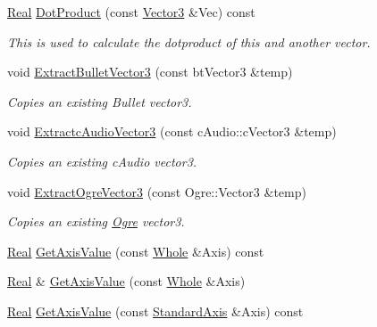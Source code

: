 \begin{DoxyCompactItemize}
\hyperlink{namespaceMezzanine_a726731b1a7df72bf3583e4a97282c6f6}{Real} \hyperlink{classMezzanine_1_1Vector3_ad49630dbeff2f1b63ce7c7e1d0faf4b8}{DotProduct} (const \hyperlink{classMezzanine_1_1Vector3}{Vector3} \&Vec) const 
\begin{DoxyCompactList}\small\item\em This is used to calculate the dotproduct of this and another vector. \item\end{DoxyCompactList}\item 
void \hyperlink{classMezzanine_1_1Vector3_afc8fcb7fb9de94c05db4cc8a568363f9}{ExtractBulletVector3} (const btVector3 \&temp)
\begin{DoxyCompactList}\small\item\em Copies an existing Bullet vector3. \item\end{DoxyCompactList}\item 
void \hyperlink{classMezzanine_1_1Vector3_a067981af0fe3fca1e3589de024473a61}{ExtractcAudioVector3} (const cAudio::cVector3 \&temp)
\begin{DoxyCompactList}\small\item\em Copies an existing cAudio vector3. \item\end{DoxyCompactList}\item 
void \hyperlink{classMezzanine_1_1Vector3_a8458214b99c59a30d9d8cc2d9efd19bd}{ExtractOgreVector3} (const Ogre::Vector3 \&temp)
\begin{DoxyCompactList}\small\item\em Copies an existing \hyperlink{namespaceOgre}{Ogre} vector3. \item\end{DoxyCompactList}\item 
\hyperlink{namespaceMezzanine_a726731b1a7df72bf3583e4a97282c6f6}{Real} \hyperlink{classMezzanine_1_1Vector3_a951233acb0bd76e8ca24f03a96d9ec2c}{GetAxisValue} (const \hyperlink{namespaceMezzanine_adcbb6ce6d1eb4379d109e51171e2e493}{Whole} \&Axis) const 
\item 
\hyperlink{namespaceMezzanine_a726731b1a7df72bf3583e4a97282c6f6}{Real} \& \hyperlink{classMezzanine_1_1Vector3_afb828e8355455f6f8378c98b4e1c478d}{GetAxisValue} (const \hyperlink{namespaceMezzanine_adcbb6ce6d1eb4379d109e51171e2e493}{Whole} \&Axis)
\item 
\hyperlink{namespaceMezzanine_a726731b1a7df72bf3583e4a97282c6f6}{Real} \hyperlink{classMezzanine_1_1Vector3_a9dd813882951d408a7f7795fc1391973}{GetAxisValue} (const \hyperlink{namespaceMezzanine_ab41a00a8c6a47b576dc987ec34e16ba1}{StandardAxis} \&Axis) const 

\end{DoxyCompactItemize}
